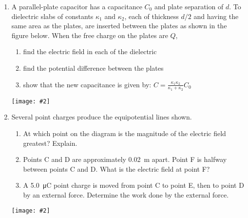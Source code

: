 \documentclass[12pt]{article}
\newcommand{\pic}[2]{\texttt{[image: \#2]}}
\begin{document}
\begin{enumerate}[leftmargin=15pt]
\item A parallel-plate capacitor has a capacitance $C_0$ and plate separation
  of $d$. To dielectric slabs of constants $\kappa_1$ and $\kappa_2$, each of
  thickness $d/2$ and having the same area as the plates, are inserted between
  the plates as shown in the figure below. When the free charge on the plates
  are $Q$,
  \begin{enumerate}[noitemsep]
  \item find the electric field in each of the dielectric
  \item find the potential difference between the plates
  \item show that the new capacitance is given by:
    $\displaystyle C=\frac{\kappa_1\kappa_2}{\kappa_1+\kappa_2}C_0$
  \end{enumerate}
  \pic{0.25}{stacked.png}
  \vspace{1.5in}

\item Several point charges produce the equipotential lines shown.
  \begin{enumerate}[noitemsep]
  \item At which point on the diagram is the magnitude of the electric field
    greatest? Explain.
  \item Points C and D are approximately \SI{0.02}{\metre} apart. Point F is
    halfway between points C and D. What is the electric field at point F?
  \item A \SI{5.0}{\micro\coulomb} point charge is moved from point C to point
    E, then to point D by an external force. Determine the work done by the
    external force.
  \end{enumerate}
  \pic{.45}{equipotentials.png}
\end{enumerate}
\end{document}
